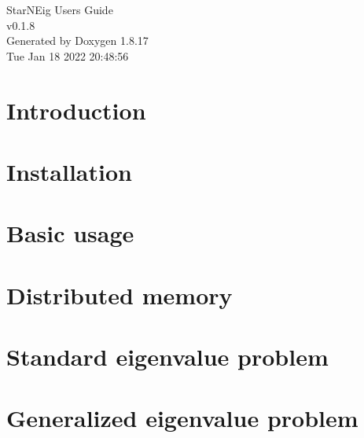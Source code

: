 \let\mypdfximage\pdfximage\def\pdfximage{\immediate\mypdfximage}\documentclass[twoside]{book}
\newcommand{\+}{\discretionary{\mbox{\scriptsize$\hookleftarrow$}}{}{}}
\newcommand{\clearemptydoublepage}{%
  \newpage{\pagestyle{empty}\cleardoublepage}%
}
\begin{document}
\hypersetup{pageanchor=false,
             bookmarksnumbered=true,
             pdfencoding=unicode
            }
\begin{titlepage}
\vspace*{7cm}
\begin{center}%
{\Large Star\+N\+Eig User\textquotesingle{}s Guide \\[1ex]\large v0.\+1.\+8 }\\
\vspace*{1cm}
{\large Generated by Doxygen 1.8.17}\\
\vspace*{0.5cm}
{\small Tue Jan 18 2022 20:48:56}\\
\end{center}
\end{titlepage}
\clearemptydoublepage
{}
\tableofcontents
\clearemptydoublepage
{}
\hypersetup{pageanchor=true}

\chapter{Introduction}
\label{index}\hypertarget{index}{}
\chapter{Installation}
\label{md__1_installation}

\chapter{Basic usage}
\label{md__2_basics}

\chapter{Distributed memory}
\label{md__3_distributed_memory}

\chapter{Standard eigenvalue problem}
\label{md__4_standard}

\chapter{Generalized eigenvalue problem}
\label{md__5_generalized}

\end{document}
